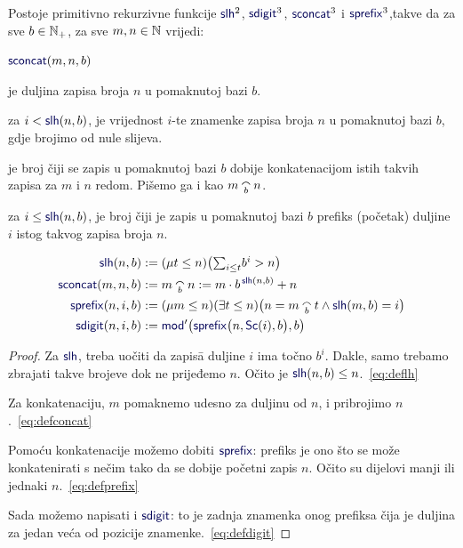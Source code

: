 \begin{lema}[{name=[rad sa zapisima u pomaknutoj bazi]}]\label{lm:ldcpprn}
Postoje primitivno rekurzivne funkcije $\f{slh}^2$, $\f{sdigit}^3$, $\f{sconcat}^3$ i $\f{sprefix}^3$,\newline takve da za sve $b\in{\mathbb N}_+$, za sve $m,n\in{\mathbb N}$ vrijedi:
\begin{labeling}{$\f{sconcat}(m,n,b)$}
    \item[$\f{slh}(n,b)$] je duljina zapisa broja $n$ u pomaknutoj bazi $b$. \item[$\f{sdigit}(n,i,b)$] za $i<\f{slh}(n,b)$, je vrijednost $i$-te znamenke zapisa broja $n$ u pomaknutoj bazi $b$, gdje brojimo od nule slijeva.
    \item[$\f{sconcat}(m,n,b)$] je broj čiji se zapis u pomaknutoj bazi $b$ dobije konkatenacijom istih takvih zapisa za $m$ i $n$ redom. Pišemo ga i kao $m\conc bn$.
    \item[$\f{sprefix}(n,i,b)$] za $i\le\f{slh}(n,b)$, je broj čiji je zapis u pomaknutoj bazi $b$ prefiks (početak) duljine $i$ istog takvog zapisa broja $n$.
\end{labeling}
\end{lema}
\noindent\begin{align}
\label{eq:deflh}
    \f{slh}(n,b)&:=(\mu t\le n)\big(\!
    \textstyle\sum_{i\le t}\!b^i>n
    \big)\\
\label{eq:defconcat}
    \f{sconcat}(m,n,b)&:=m\conc bn:=m\cdot b^{\,\f{slh}(n,b)}+n\\
\label{eq:defprefix}
    \f{sprefix}(n,i,b)&:=(\mu m\le n)(\exists t\le n)\bigl(n=m\conc bt\land\f{slh}(m,b)=i\bigr)\\
\label{eq:defdigit}
    \f{sdigit}(n,i,b)&:=\f{mod}'\bigl(\f{sprefix}\bigl(n,\f{Sc}(i),b\bigr),b\bigr)
\end{align}
\begin{proof}
Za $\f{slh}$, treba uočiti da zapis\=a duljine $i$ ima točno $b^i$. Dakle, samo trebamo zbrajati takve brojeve dok ne prijeđemo $n$. Očito je $\f{slh}(n,b)\le n$.~\eqref{eq:deflh}

Za konkatenaciju, $m$ pomaknemo udesno za duljinu od $n$, i pribrojimo $n$.~\eqref{eq:defconcat}

Pomoću konkatenacije možemo dobiti $\f{sprefix}$: prefiks je ono što se može konkatenirati s nečim tako da se dobije početni zapis $n$. Očito su dijelovi manji ili jednaki $n$.~\eqref{eq:defprefix} %

Sada možemo napisati i $\f{sdigit}$: to je zadnja znamenka onog prefiksa čija je duljina za jedan veća od pozicije znamenke.~\eqref{eq:defdigit}
\end{proof}


